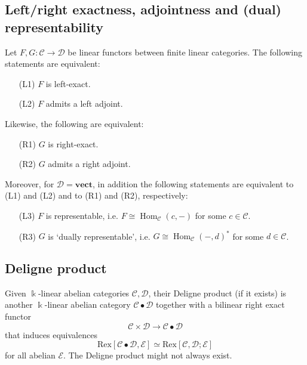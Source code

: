 \documentclass[11pt]{article}
\theoremstyle{definition}
\begin{document}
\subsection{Left/right exactness, adjointness and (dual) representability}

Let \( F, G : \mathcal{C} \to \mathcal{D} \) be linear functors between finite linear categories. The following statements are equivalent:
\begin{itemize}
    \item[(L1)] \( F \) is left-exact.
    \item[(L2)] \( F \) admits a left adjoint.
\end{itemize}
Likewise, the following are equivalent:
\begin{itemize}
    \item[(R1)] \( G \) is right-exact.
    \item[(R2)] \( G \) admits a right adjoint.
\end{itemize}
Moreover, for \(\mathcal{D} = \mathbf{vect}\), in addition the following statements are equivalent to (L1) and (L2) and to (R1) and (R2), respectively:
\begin{itemize}
    \item[(L3)] \( F \) is representable, i.e. \( F \cong \operatorname{Hom}_{\mathcal{C}}(c, -) \) for some \( c \in \mathcal{C} \).
    \item[(R3)] \( G \) is `dually representable', i.e. \( G \cong \operatorname{Hom}_{\mathcal{C}}(-, d)^* \) for some \( d \in \mathcal{C} \).
\end{itemize}

\subsection{Deligne product}

Given \(\Bbbk\)-linear abelian categories \(\mathcal{C}, \mathcal{D}\), their Deligne product (if it exists) is another \(\Bbbk\)-linear abelian category \(\mathcal{C} \bullet \mathcal{D}\) together with a bilinear right exact functor
\[
\mathcal{C} \times \mathcal{D} \to \mathcal{C} \bullet \mathcal{D}
\]
that induces equivalences
\[
\mathrm{Rex}[\mathcal{C} \bullet \mathcal{D}, \mathcal{E}] \simeq \mathrm{Rex}[\mathcal{C}, \mathcal{D}; \mathcal{E}]
\]
for all abelian \(\mathcal{E}\). The Deligne product might not always exist.
\end{document}
